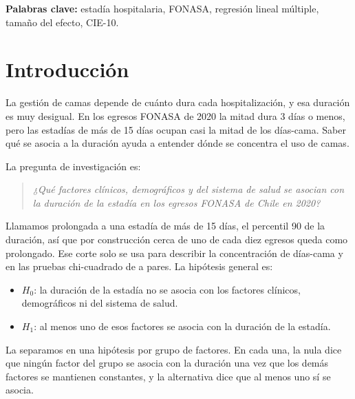 \documentclass[10.5pt,a4paper,headings=small,abstract=false,bibliography=totoc,listof=totoc]{scrartcl}
\newcommand{\cie}{\mbox{CIE-10}}
\begin{document}
\vspace{0.4em}
{\small\color{gris}\textbf{Palabras clave:} estadía hospitalaria, FONASA, regresión lineal múltiple, tamaño del efecto, \cie.\par}

\clearpage
\tableofcontents
\vspace{1.2em}
\listoftables
\vspace{1.2em}
\listoffigures

\clearpage
{}

\section{Introducción}

La gestión de camas depende de cuánto dura cada hospitalización, y esa duración es muy desigual. En los egresos FONASA de 2020 la mitad dura 3 días o menos, pero las estadías de más de 15 días ocupan casi la mitad de los días-cama. Saber qué se asocia a la duración ayuda a entender dónde se concentra el uso de camas.

La pregunta de investigación es:

\begin{quote}
\emph{¿Qué factores clínicos, demográficos y del sistema de salud se asocian con la duración de la estadía en los egresos FONASA de Chile en 2020?}
\end{quote}

Llamamos prolongada a una estadía de más de 15 días, el percentil 90 de la duración, así que por construcción cerca de uno de cada diez egresos queda como prolongado. Ese corte solo se usa para describir la concentración de días-cama y en las pruebas chi-cuadrado de a pares. La hipótesis general es:

\begin{itemize}\setlength\itemsep{0pt}
\item $H_0$: la duración de la estadía no se asocia con los factores clínicos, demográficos ni del sistema de salud.
\item $H_1$: al menos uno de esos factores se asocia con la duración de la estadía.
\end{itemize}

La separamos en una hipótesis por grupo de factores. En cada una, la nula dice que ningún factor del grupo se asocia con la duración una vez que los demás factores se mantienen constantes, y la alternativa dice que al menos uno sí se asocia.
\end{document}

